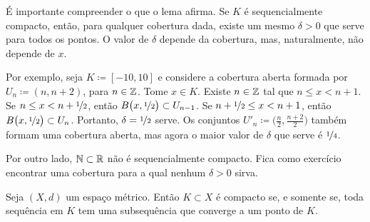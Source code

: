 É importante compreender o que o lema afirma. Se $K$ é sequencialmente
compacto, então, para qualquer cobertura dada, existe um mesmo
$\delta > 0$ que serve para todos os pontos. O valor de $\delta$ depende
da cobertura, mas, naturalmente, não depende de $x$.

Por exemplo, seja $K \coloneqq [-10,10]$ e considere a cobertura aberta
formada por $U_n \coloneqq (n,n+2)$, para $n \in {\mathbb{Z}}$.
Tome $x \in K$. Existe $n \in {\mathbb{Z}}$ tal que $n \leq x < n+1$.
Se $n \leq x < n+\nicefrac{1}{2}$, então
$B\bigl(x,\nicefrac{1}{2}\bigr) \subset U_{n-1}$.
Se $n+ \nicefrac{1}{2} \leq x < n+1$, então
$B\bigl(x,\nicefrac{1}{2}\bigr) \subset U_{n}$. Portanto,
$\delta = \nicefrac{1}{2}$ serve. Os conjuntos
$U'_n \coloneqq \bigl(\frac{n}{2},\frac{n+2}{2} \bigr)$
também formam uma cobertura aberta,
mas agora o maior valor de $\delta$ que serve é $\nicefrac{1}{4}$.

Por outro lado, ${\mathbb{N}} \subset {\mathbb{R}}$ não é sequencialmente compacto.
Fica como exercício encontrar uma cobertura para a qual nenhum
$\delta > 0$ sirva.

\begin{thm} \label{thm:mscompactisseqcpt}
Seja $(X,d)$ um espaço métrico. Então $K \subset X$ é compacto se, e
somente se, toda sequência em $K$ tem uma subsequência que converge a
um ponto de $K$.
\end{thm}

